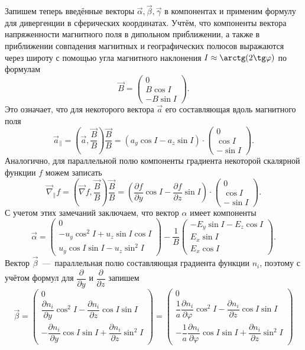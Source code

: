 \documentclass[14pt, a4paper, fleqn]{extarticle}
\begin{document}
Запишем теперь введённые векторы $\vec{\alpha}, \vec{\beta}, \vec{\gamma}$ в компонентах и применим формулу для дивергенции в сферических координатах. Учтём, что компоненты вектора напряженности магнитного поля в дипольном приближении, а также в приближении совпадения магнитных и географических полюсов выражаются через широту с помощью угла магнитного наклонения $I\approx \arctg(2\tg\varphi)$ по формулам
$$\vec{B} = \left(\begin{array}{crl}
0\\
B\cos I\\
-B\sin I
\end{array}\right).
$$
Это означает, что для некоторого вектора $\vec{a}$ его составляющая вдоль магнитного поля $$\vec{a}_\parallel = \left(\vec{a},\dfrac{\vec{B}}{B}\right)\dfrac{\vec{B}}{B} = (a_y\cos I - a_z\sin I)\cdot \left(\begin{array}{crl}
0\\
\cos I\\
-\sin I
\end{array}\right).$$
Аналогично, для параллельной полю компоненты градиента некоторой скалярной функции $f$ можем записать $$\vec{\nabla}_\parallel f = \left(\vec{\nabla} f,\dfrac{\vec{B}}{B}\right)\dfrac{\vec{B}}{B} = \left(\dfrac{\partial f}{\partial y}\cos I - \dfrac{\partial f}{\partial z}\sin I\right)\cdot \left(\begin{array}{crl}
0\\
\cos I\\
-\sin I
\end{array}\right).$$
С учетом этих замечаний заключаем, что вектор $\alpha$ имеет компоненты $$\vec{\alpha} = 
\left(\begin{array}{crl}
0\\
-u_y\cos^2 I + u_z\sin I \cos I\\
u_y\cos I \sin I - u_z\sin^2 I
\end{array}\right) - \dfrac{1}{B}
\left(\begin{array}{crl}
-E_y\sin I - E_z\cos I\\
E_x\sin I\\
E_x\cos I
\end{array}\right).$$
Вектор $\vec{\beta}$~---~параллельная полю составляющая градиента функции $n_i$, поэтому с учётом формул для $\dfrac{\partial}{\partial y}$ и $\dfrac{\partial}{\partial z}$ запишем $$\vec{\beta} = \left(\begin{array}{crl}
0\\
\dfrac{\partial n_i}{\partial y}\cos^2 I - \dfrac{\partial n_i}{\partial z}\cos I\sin I\\
-\dfrac{\partial n_i}{\partial y}\cos I\sin I + \dfrac{\partial n_i}{\partial z}\sin^2 I
\end{array}\right) = \left(\begin{array}{crl}
0\\
\dfrac{1}{a}\dfrac{\partial n_i}{\partial \varphi}\cos^2 I - \dfrac{\partial n_i}{\partial z}\cos I\sin I\\
-\dfrac{1}{a}\dfrac{\partial n_i}{\partial \varphi}\cos I\sin I + \dfrac{\partial n_i}{\partial z}\sin^2 I
\end{array}\right)$$
\end{document}

